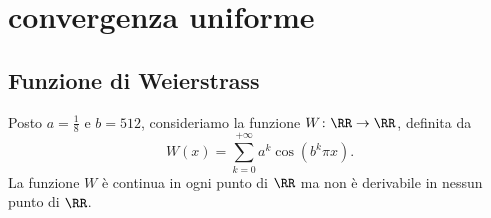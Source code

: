 \chapter{convergenza uniforme}












\section{Funzione di Weierstrass}
\begin{example}[Weierstrass]
Posto $a=\frac 1 8$ e $b=512$, 
consideriamo la funzione $W\colon \RR \to \RR$, definita da
\[
   W(x) = \sum_{k=0}^{+\infty} a^k \cos(b^k \pi x).
\]
La funzione $W$ 
è continua in ogni punto di $\RR$ 
ma non è derivabile in nessun punto di $\RR$.
\end{example}
